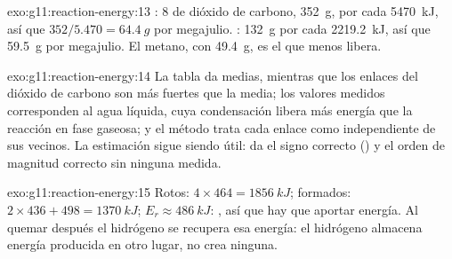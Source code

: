 \begin{solution}{exo:g11:reaction-energy:13}
: 8  de dióxido de carbono,
\qty{352}{g}, por cada \qty{5470}{kJ}, así que $352 / 5.470 = \qty{64.4}{g}$ por megajulio. :
\qty{132}{g} por cada \qty{2219.2}{kJ}, así que \qty{59.5}{g} por
megajulio. El metano, con \qty{49.4}{g}, es el que menos libera.
\end{solution}

\begin{solution}{exo:g11:reaction-energy:14}
La tabla da  medias, mientras que los enlaces 
del dióxido de carbono son más fuertes que la media; los valores medidos
corresponden al agua líquida, cuya condensación libera más energía que la
reacción en fase gaseosa; y el método trata cada enlace como
independiente de sus vecinos. La estimación sigue siendo útil: da el
signo correcto () y el orden de magnitud correcto sin ninguna
medida.
\end{solution}

\begin{solution}{exo:g11:reaction-energy:15}
Rotos: $4 \times 464 = \qty{1856}{kJ}$; formados: $2 \times 436 + 498 =
\qty{1370}{kJ}$; $E_r \approx \qty{+486}{kJ}$: , así que hay
que aportar energía. Al quemar después el hidrógeno se recupera esa
energía: el hidrógeno almacena energía producida en otro lugar, no crea
ninguna.
\end{solution}

